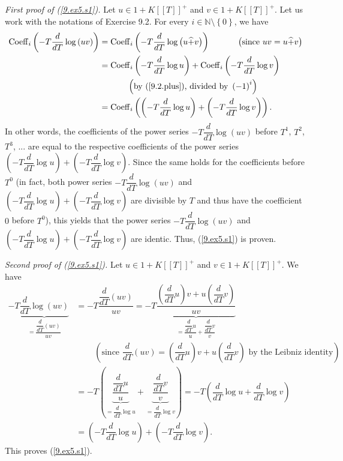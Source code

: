 \documentclass[numbers=enddot,12pt,final,onecolumn,notitlepage]{scrartcl}%
\begin{document}
\textit{First proof of (\ref{9.ex5.s1}).} Let $u\in1+K\left[  \left[
T\right]  \right]  ^{+}$ and $v\in1+K\left[  \left[  T\right]  \right]  ^{+}$.
Let us work with the notations of Exercise 9.2. For every $i\in\mathbb{N}%
\setminus\left\{  0\right\}  $, we have
\begin{align*}
\operatorname*{Coeff}\nolimits_{i}\left(  -T\dfrac{d}{dT}\log\left(
uv\right)  \right)   &  =\operatorname*{Coeff}\nolimits_{i}\left(  -T\dfrac
{d}{dT}\log\left(  u\widehat{+}v\right)  \right)  \ \ \ \ \ \ \ \ \ \ \left(
\text{since }uv=u\widehat{+}v\right) \\
&  =\operatorname*{Coeff}\nolimits_{i}\left(  -T\dfrac{d}{dT}\log u\right)
+\operatorname*{Coeff}\nolimits_{i}\left(  -T\dfrac{d}{dT}\log v\right) \\
&  \ \ \ \ \ \ \ \ \ \ \left(  \text{by (\ref{9.2.plus}), divided by }\left(
-1\right)  ^{i}\right) \\
&  =\operatorname*{Coeff}\nolimits_{i}\left(  \left(  -T\dfrac{d}{dT}\log
u\right)  +\left(  -T\dfrac{d}{dT}\log v\right)  \right)  .
\end{align*}
In other words, the coefficients of the power series $-T\dfrac{d}{dT}%
\log\left(  uv\right)  $ before $T^{1}$, $T^{2}$, $T^{3}$, $...$ are equal to
the respective coefficients of the power series $\left(  -T\dfrac{d}{dT}\log
u\right)  +\left(  -T\dfrac{d}{dT}\log v\right)  $. Since the same holds for
the coefficients before $T^{0}$ (in fact, both power series $-T\dfrac{d}%
{dT}\log\left(  uv\right)  $ and $\left(  -T\dfrac{d}{dT}\log u\right)
+\left(  -T\dfrac{d}{dT}\log v\right)  $ are divisible by $T$ and thus have
the coefficient $0$ before $T^{0}$), this yields that the power series
$-T\dfrac{d}{dT}\log\left(  uv\right)  $ and $\left(  -T\dfrac{d}{dT}\log
u\right)  +\left(  -T\dfrac{d}{dT}\log v\right)  $ are identic. Thus,
(\ref{9.ex5.s1}) is proven.

\textit{Second proof of (\ref{9.ex5.s1}).} Let $u\in1+K\left[  \left[
T\right]  \right]  ^{+}$ and $v\in1+K\left[  \left[  T\right]  \right]  ^{+}$.
We have%
\begin{align*}
-T\underbrace{\dfrac{d}{dT}\log\left(  uv\right)  }_{=\dfrac{\dfrac{d}%
{dT}\left(  uv\right)  }{uv}}  &  =-T\dfrac{\dfrac{d}{dT}\left(  uv\right)
}{uv}=-T\underbrace{\dfrac{\left(  \dfrac{d}{dT}u\right)  v+u\left(  \dfrac
{d}{dT}v\right)  }{uv}}_{=\dfrac{\dfrac{d}{dT}u}{u}+\dfrac{\dfrac{d}{dT}v}{v}%
}\\
&  \ \ \ \ \ \ \ \ \ \ \left(  \text{since }\dfrac{d}{dT}\left(  uv\right)
=\left(  \dfrac{d}{dT}u\right)  v+u\left(  \dfrac{d}{dT}v\right)  \text{ by
the Leibniz identity}\right) \\
&  =-T\left(  \underbrace{\dfrac{\dfrac{d}{dT}u}{u}}_{=\dfrac{d}{dT}\log
u}+\underbrace{\dfrac{\dfrac{d}{dT}v}{v}}_{=\dfrac{d}{dT}\log v}\right)
=-T\left(  \dfrac{d}{dT}\log u+\dfrac{d}{dT}\log v\right) \\
&  =\left(  -T\dfrac{d}{dT}\log u\right)  +\left(  -T\dfrac{d}{dT}\log
v\right)  .
\end{align*}
This proves (\ref{9.ex5.s1}).
\end{document}

